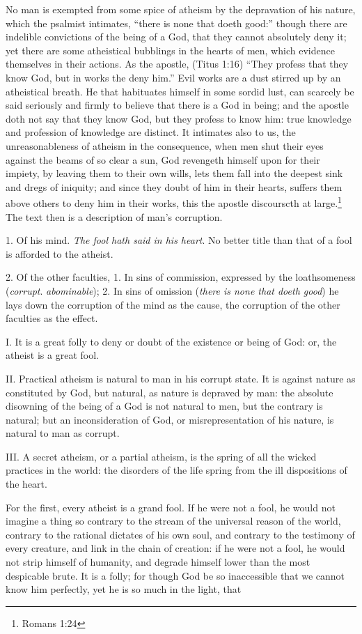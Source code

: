 \documentclass{article}
\begin{document}
No man is exempted from some spice of atheism by the depravation of his nature,
    which the psalmist intimates, 
    ``there is none that doeth good:''
    though there are indelible convictions of the being of a God,
    that they cannot absolutely deny it; 
    yet there are some atheistical bubblings in the hearts of men, 
    which evidence themselves in their actions. 
As the apostle, (Titus 1:16) ``They profess that they know God, 
    but in works the deny him.'' 
Evil works are a dust stirred up by an atheistical breath. 
He that habituates himself in some sordid lust, 
    can scarcely be said seriously and firmly to believe 
    that there is a God in being; 
    and the apostle doth not say that they know God, 
    but they profess to know him: 
    true knowledge and profession of knowledge are distinct.
It intimates also to us, 
    the unreasonableness of atheism in the consequence, 
    when men shut their eyes against the beams of so clear a sun,
    God revengeth himself upon for their impiety, 
    by leaving them to their own wills, 
    lets them fall into the deepest sink and dregs of iniquity; 
    and since they doubt of him in their hearts, 
    suffers them above others to deny him in their works, 
    this the apostle discourscth at large.\footnote{Romans 1:24}
The text then is a description of man’s corruption.

1. Of his mind. \emph{The fool hath said in his heart}. 
    No better title than that of a fool is afforded to the atheist.

2. Of the other faculties, 
    1. In sins of commission, expressed by the loathsomeness
    (\emph{corrupt}. \emph{abominable}); 
    2. In sins of omission (\emph{there is none that doeth good})
    he lays down the corruption of the mind as the cause,
    the corruption of the other faculties as the effect.

I. It is a great folly to deny or doubt of the existence or being of God:
    or, the atheist is a great fool.

II. Practical atheism is natural to man in his corrupt state. 
It is against nature as constituted by God, but natural, 
    as nature is depraved by man: 
    the absolute disowning of the being of a God is not natural to men, 
    but the contrary is natural; 
    but an inconsideration of God, or misrepresentation of his nature, 
    is natural to man as corrupt.

III. A secret atheism, or a partial atheism, 
    is the spring of all the wicked practices in the world: 
    the disorders of the life spring from the ill dispositions of the heart.

For the first, every atheist is a grand fool. 
If he were not a fool, he would not imagine a thing so contrary 
    to the stream of the universal reason of the world, 
    contrary to the rational dictates of his own soul, 
    and contrary to the testimony of every creature, 
    and link in the chain of creation: 
    if he were not a fool, he would not strip himself of humanity, 
    and degrade himself lower than the most despicable brute. 
It is a folly; for though God be so inaccessible 
    that we cannot know him perfectly, 
    yet he is so much in the light, that
\end{document}
